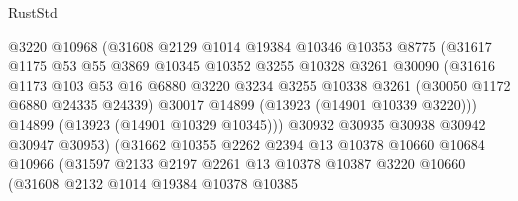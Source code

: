 \begin{lexlean}{RustStd}
\begin{coremodule}
                            @3220
                            @10968
                            (@31608
                              @2129
                              @1014
                              @19384
                              @10346
                              @10353
                              @8775
                              (@31617
                                @1175
                                @53
                                @55
                                @3869
                                @10345
                                @10352
                                @3255
                                @10328
                                @3261
                                @30090
                                (@31616
                                  @1173
                                  @103
                                  @53
                                  @16
                                  @6880
                                  @3220
                                  @3234
                                  @3255
                                  @10338
                                  @3261
                                  (@30050 @1172 @6880 @24335 @24339)
                                  @30017
                                  @14899
                                  (@13923 (@14901 @10339 @3220)))
                                @14899
                                (@13923 (@14901 @10329 @10345)))
                              @30932
                              @30935
                              @30938
                              @30942
                              @30947
                              @30953)
                            (@31662
                              @10355
                              @2262
                              @2394
                              @13
                              @10378
                              @10660
                              @10684
                              @10966
                              (@31597
                                @2133
                                @2197
                                @2261
                                @13
                                @10378
                                @10387
                                @3220
                                @10660
                                (@31608
                                  @2132
                                  @1014
                                  @19384
                                  @10378
                                  @10385

\end{coremodule}
\end{lexlean}
